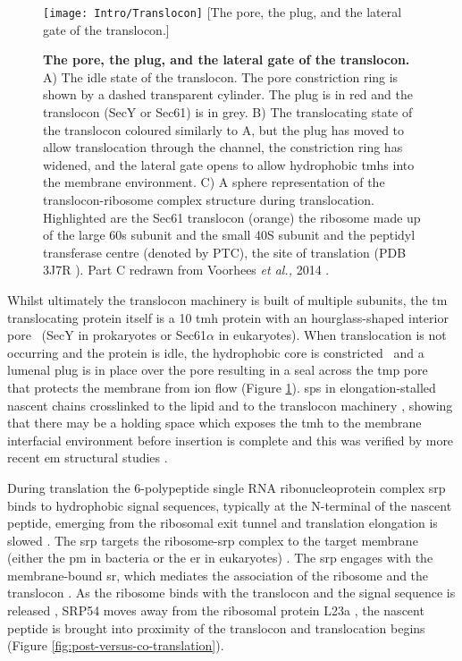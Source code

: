 \begin{figure}[ht!]
\centering
\texttt{[image: Intro/Translocon]}
	 [The pore, the plug, and the lateral gate of the translocon.]{\textbf{The pore, the plug, and the lateral gate of the translocon.}
	 A) The idle state of the translocon.
	 The pore constriction ring is shown by a dashed transparent cylinder.
	 The plug is in red and the translocon (SecY or Sec61) is in grey.
	 B) The translocating state of the translocon coloured similarly to A, but the plug has moved to allow translocation through the channel, the constriction ring has widened, and the lateral gate opens to allow hydrophobic \gls{tmh}s into the membrane environment.
	 C) A sphere representation of the translocon-ribosome complex structure during translocation.
	 Highlighted are the Sec61 translocon (orange) the ribosome made up of the large 60s subunit and the small 40S subunit and the peptidyl transferase centre (denoted by PTC), the site of translation (PDB 3J7R \cite{Voorhees2014}).
	 Part C redrawn from Voorhees \textit{et al.,} 2014 \cite{Voorhees2014}.

	 }
\label{fig:Translocon}
\end{figure}

Whilst ultimately the translocon machinery is built of multiple subunits, the \gls{tm} translocating protein itself is a 10 \gls{tmh} protein with an hourglass\--shaped interior pore~\cite{Berg2004} (SecY in prokaryotes or Sec61$\alpha$ in eukaryotes).
When translocation is not occurring and the protein is idle, the hydrophobic core is constricted~\cite{Junne2010} and a lumenal plug is in place over the pore resulting in a seal across the \gls{tmp} pore~\cite{Tam2005, Junne2006} that protects the membrane from ion flow \cite{Park2011} (Figure \ref{fig:Translocon}).
\gls{sp}s in elongation\--stalled nascent chains crosslinked to the lipid and to the translocon machinery \cite{Martoglio1995}, showing that there may be a holding space which exposes the \gls{tmh} to the membrane interfacial environment before insertion is complete and this was verified by more recent \gls{em} structural studies \cite{Gogala2014, Park2012}.

During translation the 6\--polypeptide single RNA ribonucleoprotein complex \gls{srp} binds to hydrophobic signal sequences, typically at the N\--terminal of the nascent peptide, emerging from the ribosomal exit tunnel and translation elongation is slowed \cite{Walter1981}.
The \gls{srp} targets the ribosome\--\gls{srp} complex to the target membrane (either the \gls{pm} in bacteria or the \gls{er} in eukaryotes) \cite{Rapoport2007, Pool2005}.
The \gls{srp} engages with the membrane\--bound \gls{sr}, which mediates the association of the ribosome and the translocon \cite{Song2000}.
As the ribosome binds with the translocon and the signal sequence is released \cite{Fulga2001}, SRP54 moves away from the ribosomal protein L23a \cite{Pool2002}, the nascent peptide is brought into proximity of the translocon \cite{Shan2005} and translocation begins (Figure \ref{fig:post-versus-co-translation}).

